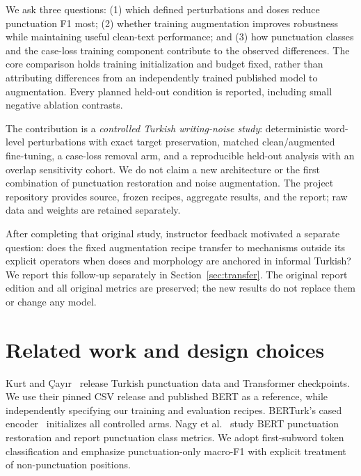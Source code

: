\documentclass{article}
\begin{document}
We ask three questions: (1) which defined perturbations and doses reduce
punctuation F1 most; (2) whether training augmentation improves robustness while
maintaining useful clean-text performance; and (3) how punctuation classes and
the case-loss training component contribute to the observed differences.
The core comparison holds training initialization and budget fixed, rather than
attributing differences from an independently trained published model to
augmentation. Every planned held-out condition is reported, including small
negative ablation contrasts.

The contribution is a \emph{controlled Turkish writing-noise study}: deterministic
word-level perturbations with exact target preservation, matched clean/augmented
fine-tuning, a case-loss removal arm, and a reproducible held-out analysis with an
overlap sensitivity cohort. We do not claim a new architecture or the first
combination of punctuation restoration and noise augmentation. The project
repository provides source, frozen recipes, aggregate results, and the report;
raw data and weights are retained separately.

After completing that original study, instructor feedback motivated a separate
question: does the fixed augmentation recipe transfer to mechanisms outside its
explicit operators when doses and morphology are anchored in informal Turkish?
We report this follow-up separately in Section~\ref{sec:transfer}. The original
report edition and all original metrics are preserved; the new results do not
replace them or change any model.

\section{Related work and design choices}
Kurt and \c{C}ay\i r~\cite{kurt2023} release Turkish punctuation data and Transformer
checkpoints. We use their pinned CSV release and published BERT as a reference,
while independently specifying our training and evaluation recipes. BERTurk's
cased encoder~\cite{berturk} initializes all controlled arms. Nagy et
al.~\cite{nagy2021} study BERT punctuation restoration and report punctuation
class metrics. We adopt first-subword token classification and emphasize
punctuation-only macro-F1 with explicit treatment of non-punctuation positions.
\end{document}

